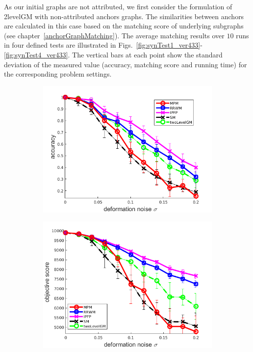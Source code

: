 As our initial graphs are not attributed, we first consider the formulation of 2levelGM with non-attributed anchors graphs. The similarities between anchors are calculated in this case based on the matching score of underlying subgraphs (see chapter~\ref{anchorGraphMatching}). The average matching results over $10$ runs in four defined tests are illustrated in Figs.~\ref{fig:synTest1_ver433}-\ref{fig:synTest4_ver433}. The vertical bars at each point show the standard deviation of the measured value (accuracy, matching score and running time) for the corresponding problem settings.


\begin{figure}[h] 
	\begin{subfigure}[b]{0.3\textwidth}
		\centering
		\includegraphics[scale=0.25]{"chapter3/fig/SyntheticTest/no_descr/Results_v4.3.3/Test2/accuracy_avg10t"} 
	\end{subfigure}
	\begin{subfigure}[b]{0.3\textwidth}
		\centering
		\includegraphics[scale=0.25]{"chapter3/fig/SyntheticTest/no_descr/Results_v4.3.3/Test2/score_avg10t"} 

\end{subfigure}
\end{figure}

